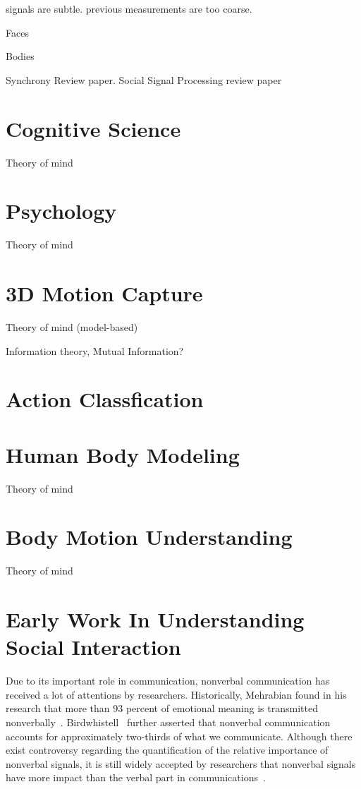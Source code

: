 signals are subtle. previous measurements are too coarse.


Faces

Bodies


Synchrony Review paper. 
Social Signal Processing review paper 




\section{Cognitive Science}
Theory of mind

\section{Psychology}
Theory of mind


\section{3D Motion Capture}
Theory of mind (model-based)


Information theory, Mutual Information?

\section{Action Classfication}


\section{Human Body Modeling}
Theory of mind



\section{Body Motion Understanding}
Theory of mind


\section{Early Work In Understanding Social Interaction}

Due to its important role in communication, nonverbal communication has received a lot of attentions by researchers. Historically, Mehrabian found in his research that more than 93 percent of emotional meaning is transmitted nonverbally~\cite{Mehrabian67,Mehrabian81}. Birdwhistell~\cite{Birdwhistell70} further asserted that nonverbal communication accounts for approximately two-thirds of what we communicate. Although there exist controversy regarding the quantification of the relative importance of nonverbal signals, it is still widely accepted by researchers that nonverbal signals have more impact than the verbal part in communications~\cite{Moore13}.

